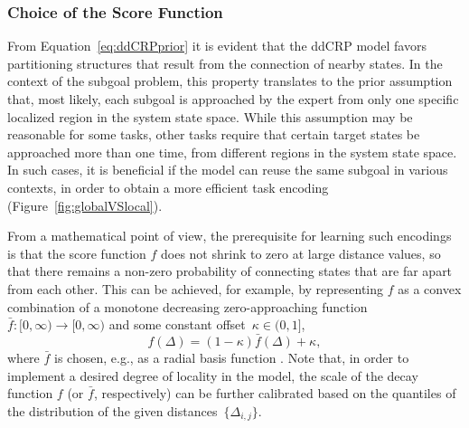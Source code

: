 \documentclass[twoside,11pt]{article}
\newcommand{\eqkomma}{,}
\newcommand{\eg}{e.g.}
\begin{document}
\subsubsection{Choice of the Score Function}
From Equation~\eqref{eq:ddCRPprior} it is evident that the ddCRP model %
favors partitioning structures %
that result from the connection of nearby states. In the context of the subgoal problem, this property translates to the prior assumption that, most likely, each subgoal is approached by the expert from only one specific localized region in the system state space. While this assumption may be reasonable for some tasks, other tasks require that certain target states be approached %
more than one time, from different regions in the system state space. In such cases, it is beneficial if the model can reuse the same subgoal in various contexts, in order to obtain a more efficient task encoding %
(Figure~\ref{fig:globalVSlocal}). 

From a mathematical point of view, the prerequisite for learning such encodings is that the score function $f$ does not shrink to zero at large distance values, so that there remains a non-zero probability of connecting states %
that are far apart from each other. This can be achieved, for example, by representing %
%
$f$ as a convex combination of a monotone decreasing zero-approaching function $\bar{f}:[0,\infty)\rightarrow[0,\infty)$  and some constant offset~$\kappa\in(0,1]$,
\begin{equation*}
	f(\Delta) = (1-\kappa)\bar{f}(\Delta) + \kappa\eqkomma
\end{equation*}
where $\bar{f}$ is chosen, \eg, as a radial basis function \citep{sosic2018pami}. Note that, in order to implement a desired degree of locality in the model, the scale of the decay function $f$ (or $\bar{f}$, respectively) can be further calibrated %
%
based on the quantiles of 
the distribution of the given distances~$\{\Delta_{i,j}\}$.

%
%
%
%
%
%
%
%
\end{document}
